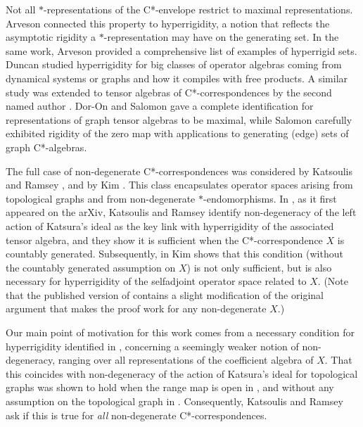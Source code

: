 \documentclass[11pt, draft]{amsart}
\numberwithin{equation}{section}
\theoremstyle{plain}
\theoremstyle{definition}
\theoremstyle{remark}
\begin{document}
Not all $*$-representations of the C*-envelope restrict to maximal representations.
Arveson \cite{Arv11} connected this property to hyperrigidity, a notion that reflects the asymptotic rigidity a $*$-representation may have on the generating set.
In the same work, Arveson provided a comprehensive list of examples of hyperrigid sets.
Duncan \cite{Dun08, Dun10} studied hyperrigidity for big classes of operator algebras coming from dynamical systems or graphs and how it compiles with free products.
A similar study was extended to tensor algebras of C*-correspondences by the second named author \cite{Kak13}.
Dor-On and Salomon \cite{DS18} gave a complete identification for representations of graph tensor algebras to be maximal, while Salomon \cite{Sal17} carefully exhibited rigidity of the zero map with applications to generating (edge) sets of graph C*-algebras.

The full case of non-degenerate C*-correspondences was considered by Katsoulis and Ramsey \cite{KR20, KR21}, and by Kim \cite{Kim21}.
This class encapsulates operator spaces arising from topological graphs and from non-degenerate $*$-endomorphisms.
In \cite{KR21}, as it first appeared on the arXiv, Katsoulis and Ramsey identify non-degeneracy of the left action of Katsura's ideal as the key link with hyperrigidity of the associated tensor algebra, and they show it is sufficient when the C*-correspondence $X$ is countably generated. 
Subsequently, in \cite{Kim21} Kim shows that this condition (without the countably generated assumption on $X$) is not only sufficient, but is also necessary for hyperrigidity of the selfadjoint operator space related to $X$. 
(Note that the published version of \cite{KR21} contains a slight modification of the original argument that makes the proof work for any non-degenerate $X$.)

Our main point of motivation for this work comes from a necessary condition for hyperrigidity identified in \cite{KR20}, concerning a seemingly weaker notion of non-degeneracy, ranging over all representations of the coefficient algebra of $X$.
That this coincides with non-degeneracy of the action of Katsura's ideal for topological graphs was shown to hold when the range map is open in \cite{Kim21}, and without any assumption on the topological graph in \cite{KR20}.
Consequently, Katsoulis and Ramsey \cite{KR20} ask if this is true for \emph{all} non-degenerate C*-correspondences.
\end{document}
